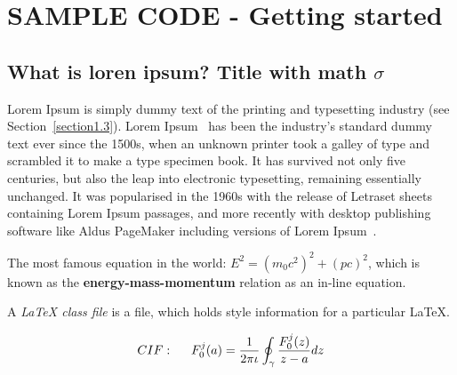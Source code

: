 
\chapter{SAMPLE CODE - Getting started}  %

\ifpdf
\graphicspath{{P2-Results/Figs/Raster/}{P2-Results/Figs/PDF/}{P2-Results/Figs/}}
\else
\graphicspath{{P2-Results/Figs/Vector/}{P2-Results/Figs/}}
\fi

\section{What is loren ipsum? Title with math \texorpdfstring{$\sigma$}{[sigma]}} %

Lorem Ipsum is simply dummy text of the printing and typesetting industry (see 
Section~\ref{section1.3}). Lorem Ipsum~\citep{Aup91} has been the industry's 
standard dummy text ever since the 1500s, when an unknown printer took a galley 
of type and scrambled it to make a type specimen book. It has survived not only 
five centuries, but also the leap into electronic typesetting, remaining 
essentially unchanged. It was popularised in the 1960s with the release of 
Letraset sheets containing Lorem Ipsum passages, and more recently with desktop 
publishing software like Aldus PageMaker including versions of Lorem 
Ipsum~\citep{AAB95,Con90,LM65}.

The most famous equation in the world: $E^2 = (m_0c^2)^2 + (pc)^2$, which is 
known as the \textbf{energy-mass-momentum} relation as an in-line equation.

A {\em \LaTeX{} class file} is a file, which holds style information for a particular \LaTeX{}.


\begin{align}
CIF: \hspace*{5mm}F_0^j(a) = \frac{1}{2\pi \iota} \oint_{\gamma} \frac{F_0^j(z)}{z - a} dz
\end{align}

